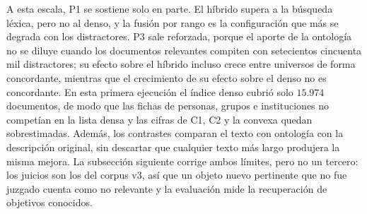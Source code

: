 \documentclass[11pt,letterpaper]{article}
\numberwithin{equation}{section}
\begin{document}
A esta escala, P1 se sostiene solo en parte. El híbrido supera a la búsqueda léxica, pero no al denso, y la fusión por rango es la configuración que más se degrada con los distractores. P3 sale reforzada, porque el aporte de la ontología no se diluye cuando los documentos relevantes compiten con setecientos cincuenta mil distractores; su efecto sobre el híbrido incluso crece entre universos de forma concordante, mientras que el crecimiento de su efecto sobre el denso no es concordante. En esta primera ejecución el índice denso cubrió solo $15.974$ documentos, de modo que las fichas de personas, grupos e instituciones no competían en la lista densa y las cifras de C1, C2 y la convexa quedan sobrestimadas. Además, los contrastes comparan el texto con ontología con la descripción original, sin descartar que cualquier texto más largo produjera la misma mejora. La subsección siguiente corrige ambos límites, pero no un tercero: los juicios son los del corpus v3, así que un objeto nuevo pertinente que no fue juzgado cuenta como no relevante y la evaluación mide la recuperación de objetivos conocidos.
\end{document}
